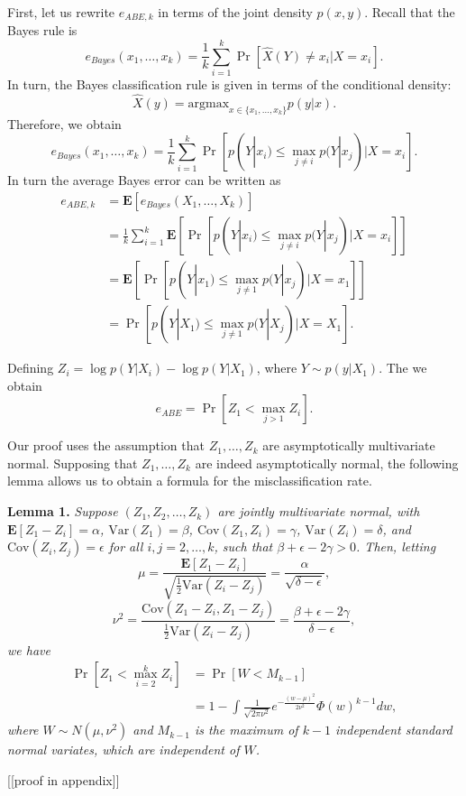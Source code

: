 \documentclass{article}
\newcommand{\E}{\textbf{E}}
\newcommand{\argmax}{\text{argmax}}
\newcommand{\Cov}{\text{Cov}}
\newcommand{\Var}{\text{Var}}
\begin{document}
First, let us rewrite $e_{ABE, k}$ in terms of the joint density $p(x, y)$.  Recall that the Bayes rule is
\[
e_{Bayes}(x_1,\hdots, x_k) = \frac{1}{k}\sum_{i=1}^k \Pr[\hat{X}(Y) \neq x_i| X = x_i].
\]
In turn, the Bayes classification rule is given in terms of the conditional density:
\[
\hat{X}(y) = \argmax_{x \in \{x_1,\hdots, x_k\}} p(y|x).
\]
Therefore, we obtain
\[
e_{Bayes}(x_1,\hdots, x_k) = \frac{1}{k}\sum_{i=1}^k \Pr[p(Y|x_i) \leq \max_{j \neq i} p(Y|x_j)| X = x_i].
\]
In turn the average Bayes error can be written as
\begin{align}
e_{ABE, k} &= \E[e_{Bayes}(X_1,\hdots, X_k)]
\\&= \frac{1}{k}\sum_{i=1}^k \E[\Pr[p(Y|x_i) \leq \max_{j \neq i} p(Y|x_j)| X = x_i]]
\\&= \E[\Pr[p(Y|x_1) \leq \max_{j \neq 1} p(Y|x_j)| X = x_1]]
\\&= \Pr[p(Y|X_1) \leq \max_{j \neq 1} p(Y|X_j)| X = X_1].
\end{align}

Defining $Z_i = \log p(Y|X_i) - \log p(Y|X_1)$, where $Y \sim p(y|X_1)$.
The we obtain
\[
e_{ABE} = \Pr[Z_1 < \max_{j > 1} Z_i].
\]

Our proof uses the assumption that $Z_1,\hdots, Z_k$ are asymptotically multivariate normal.
Supposing that $Z_1,\hdots, Z_k$ are indeed asymptotically normal, the following lemma
allows us to obtain a formula for the misclassification rate.

\textbf{Lemma 1. }
\emph{
Suppose $(Z_1, Z_2, \hdots, Z_k)$ are jointly multivariate normal, with 
$\E[Z_1 - Z_i]= \alpha$, 
$\Var(Z_1) = \beta$, 
$\Cov(Z_1, Z_i) = \gamma$, 
$\Var(Z_i)= \delta$, and $\Cov(Z_i, Z_j) = \epsilon$ for all $i, j = 2, \hdots,
k$, such that $\beta + \epsilon - 2\gamma > 0$.  Then, letting
\[
\mu = \frac{\E[Z_1 - Z_i]}{\sqrt{\frac{1}{2}\Var(Z_i - Z_j)}} = \frac{\alpha}{\sqrt{\delta - \epsilon}},
\]
\[
\nu^2 = \frac{\Cov(Z_1 -Z_i, Z_1 - Z_j)}{\frac{1}{2}\Var(Z_i - Z_j)} = \frac{\beta + \epsilon - 2\gamma}{\delta - \epsilon},
\]
we have
\begin{align*}
\Pr[Z_1 < \max_{i=2}^k Z_i] &= \Pr[W < M_{k-1}]
\\&= 1 - \int \frac{1}{\sqrt{2\pi\nu^2}} e^{-\frac{(w-\mu)^2}{2\nu^2}} \Phi(w)^{k-1} dw,
\end{align*}
where $W \sim N(\mu, \nu^2)$ and $M_{k-1}$ is the maximum of $k-1$
independent standard normal variates, which are independent of $W$.
}

[[proof in appendix]]
\end{document}
